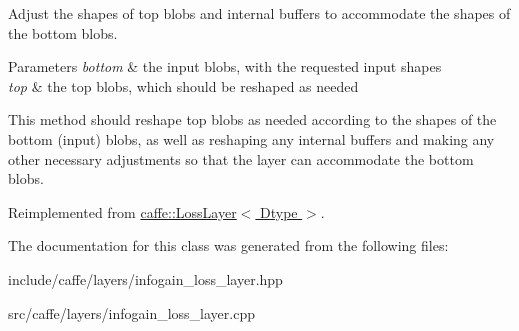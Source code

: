 Adjust the shapes of top blobs and internal buffers to accommodate the shapes of the bottom blobs. 


\begin{DoxyParams}{Parameters}
{\em bottom} & the input blobs, with the requested input shapes \\
\hline
{\em top} & the top blobs, which should be reshaped as needed\\
\hline
\end{DoxyParams}
This method should reshape top blobs as needed according to the shapes of the bottom (input) blobs, as well as reshaping any internal buffers and making any other necessary adjustments so that the layer can accommodate the bottom blobs. 

Reimplemented from \hyperlink{classcaffe_1_1LossLayer_ab15b7120ebc172274481f3732db78c9e}{caffe\+::\+Loss\+Layer$<$ Dtype $>$}.



The documentation for this class was generated from the following files\+:\begin{DoxyCompactItemize}
\item 
include/caffe/layers/infogain\+\_\+loss\+\_\+layer.\+hpp\item 
src/caffe/layers/infogain\+\_\+loss\+\_\+layer.\+cpp\end{DoxyCompactItemize}
